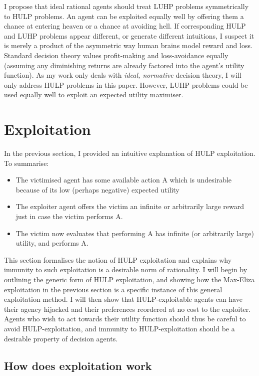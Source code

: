 \documentclass{article}
\begin{document}
I propose that ideal rational agents should treat LUHP problems symmetrically to HULP problems. An agent can be exploited equally well by offering them a chance at entering heaven or a chance at avoiding hell. If corresponding HULP and LUHP problems appear different, or generate different intuitions, I suspect it is merely a product of the asymmetric way human brains model reward and loss. Standard decision theory values profit-making and loss-avoidance equally (assuming any diminishing returns are already factored into the agent's utility function). As my work only deals with \textit{ideal, normative} decision theory, I will only address HULP problems in this paper. However, LUHP problems could be used equally well to exploit an expected utility maximiser.

\section{Exploitation}

In the previous section, I provided an intuitive explanation of HULP exploitation. To summarise:

\begin{itemize}
\item The victimised agent has some available action A which is undesirable because of its low (perhaps negative) expected utility
\item The exploiter agent offers the victim an infinite or arbitrarily large reward just in case the victim performs A. 
\item The victim now evaluates that performing A has infinite (or arbitrarily large) utility, and performs A.
\end{itemize}

This section formalises the notion of HULP exploitation and explains why immunity to such exploitation is a desirable norm of rationality. I will begin by outlining the generic form of HULP exploitation, and showing how the Max-Eliza exploitation in the previous section is a specific instance of this general exploitation method. I will then show that HULP-exploitable agents can have their agency hijacked and their preferences reordered at no cost to the exploiter. Agents who wish to act towards their utility function should thus be careful to avoid HULP-exploitation, and immunity to HULP-exploitation should be a desirable property of decision agents.

\subsection{How does exploitation work}
\end{document}
